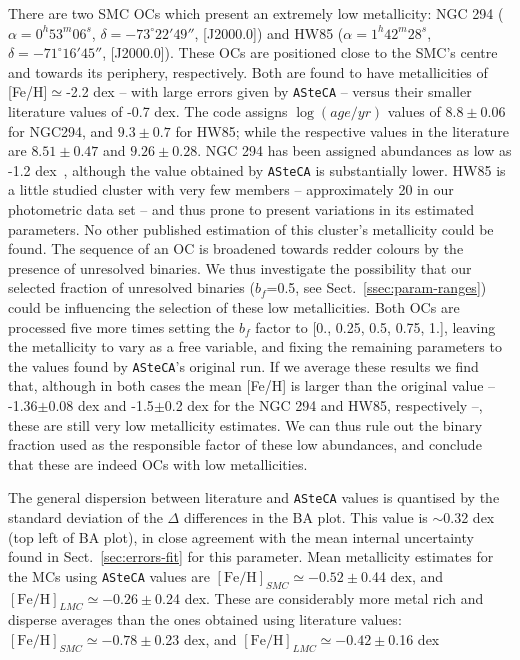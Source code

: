 \documentclass[a4paper,fleqn,usenatbib]{mnras}
\begin{document}
%
There are two SMC OCs which present an extremely low metallicity: NGC 294
($\alpha{=}0^h53^m06^s$, $\delta{=}-73^\circ22'49''$, [J2000.0]) and
HW85 ($\alpha{=}1^h42^m28^s$, $\delta{=}-71^\circ16'45''$, [J2000.0]). These
OCs are positioned close to the SMC's centre and towards its periphery,
respectively.
Both are found to have metallicities of [Fe/H]$\simeq$-2.2 dex -- with large
errors given by \texttt{ASteCA} -- versus their smaller literature values of
-0.7 dex.
The code assigns $\log(age/yr)$ values of $8.8\pm0.06$ for NGC294, and
$9.3\pm0.7$ for HW85; while the respective values in the literature are
$8.51\pm0.47$ and $9.26\pm0.28$.
%
NGC 294 has been assigned abundances as low as -1.2 dex~\citep[see the
integrated spectroscopy study by][]{Dias_2010}, although the value obtained by
\texttt{ASteCA} is substantially lower. HW85 is a little studied cluster with
very few members -- approximately 20 in our photometric data set -- and thus
prone to present variations in its estimated parameters. No other
published estimation of this cluster's metallicity could be found.
%
The sequence of an OC is broadened towards redder colours by the
presence of unresolved binaries. We thus investigate the possibility that our
selected fraction of unresolved binaries ($b_f$=0.5, see
Sect.~\ref{ssec:param-ranges}) could be influencing the selection of these low
metallicities. Both OCs are processed five more times setting the $b_f$
factor to [0., 0.25, 0.5, 0.75, 1.], leaving the metallicity to vary as a free
variable, and fixing the remaining parameters to the values found by
\texttt{ASteCA}'s original run.
If we average these results we find that, although in both cases the mean [Fe/H]
is larger than the original value -- -1.36$\pm$0.08 dex and -1.5$\pm$0.2 dex for
the NGC 294 and HW85, respectively --, these are still very low metallicity
estimates. We can thus rule out the binary fraction used as the responsible
factor of these low abundances, and conclude that these are indeed OCs with
low metallicities.

The general dispersion between literature and \texttt{ASteCA} values is
quantised by the standard deviation of the $\Delta$ differences in the BA plot.
This value is $\sim$0.32 dex (top left of BA plot), in close agreement with the
mean internal uncertainty found in Sect.~\ref{sec:errors-fit} for this
parameter. Mean metallicity estimates for the MCs using \texttt{ASteCA} values
are $\mathrm{[Fe/H]}_{SMC}{\simeq}-0.52\pm$0.44 dex, and
$\mathrm{[Fe/H]}_{LMC}{\simeq}-0.26\pm$0.24 dex. These are considerably more
metal rich and disperse averages than the ones obtained using literature values:
$\mathrm{[Fe/H]}_{SMC}{\simeq}-0.78\pm$0.23 dex, and
$\mathrm{[Fe/H]}_{LMC}{\simeq}-0.42\pm$0.16 dex\\
\end{document}
